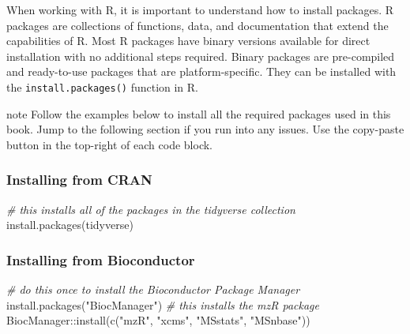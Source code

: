 \documentclass[
]{book}
\newenvironment{Shaded}{\begin{snugshade}}{\end{snugshade}}
\newcommand{\CommentTok}[1]{\textcolor[rgb]{0.56,0.35,0.01}{\textit{#1}}}
\newcommand{\FunctionTok}[1]{\textcolor[rgb]{0.00,0.00,0.00}{#1}}
\newcommand{\NormalTok}[1]{#1}
\newcommand{\SpecialCharTok}[1]{\textcolor[rgb]{0.00,0.00,0.00}{#1}}
\newcommand{\StringTok}[1]{\textcolor[rgb]{0.31,0.60,0.02}{#1}}
\begin{document}
When working with R, it is important to understand how to install packages. R packages are collections of functions, data, and documentation that extend the capabilities of R. Most R packages have binary versions available for direct installation with no additional steps required. Binary packages are pre-compiled and ready-to-use packages that are platform-specific. They can be installed with the \texttt{install.packages()} function in R.

\begin{infobox}{note}
Follow the examples below to install all the required packages used in this book. Jump to the following section if you run into any issues. Use the copy-paste button in the top-right of each code block.

\end{infobox}

\hypertarget{installing-from-cran}{%
\subsubsection*{Installing from CRAN}\label{installing-from-cran}}

\begin{Shaded}
\begin{Highlighting}[]
\CommentTok{\# this installs all of the packages in the tidyverse collection}
\FunctionTok{install.packages}\NormalTok{(}\StringTok{\textquotesingle{}tidyverse\textquotesingle{}}\NormalTok{)}
\end{Highlighting}
\end{Shaded}

\hypertarget{installing-from-bioconductor}{%
\subsubsection*{Installing from Bioconductor}\label{installing-from-bioconductor}}

\begin{Shaded}
\begin{Highlighting}[]
\CommentTok{\# do this once to install the Bioconductor Package Manager}
\FunctionTok{install.packages}\NormalTok{(}\StringTok{"BiocManager"}\NormalTok{)}
\CommentTok{\# this installs the mzR package}
\NormalTok{BiocManager}\SpecialCharTok{::}\FunctionTok{install}\NormalTok{(}\FunctionTok{c}\NormalTok{(}\StringTok{"mzR"}\NormalTok{, }\StringTok{"xcms"}\NormalTok{, }\StringTok{"MSstats"}\NormalTok{, }\StringTok{"MSnbase"}\NormalTok{))}
\end{Highlighting}
\end{Shaded}
\end{document}
